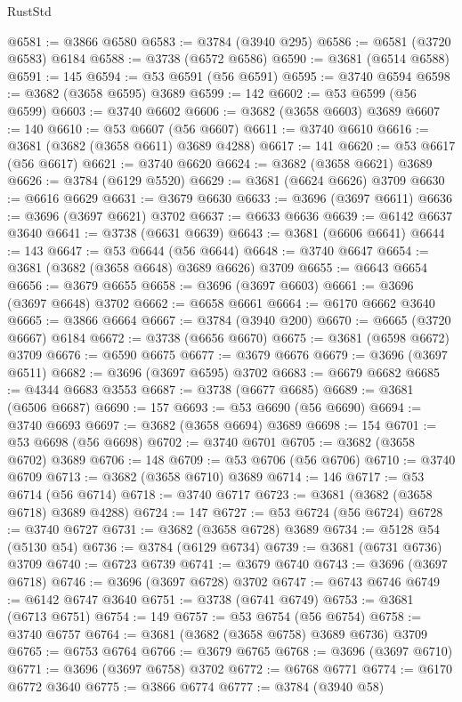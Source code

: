 \begin{lexlean}{RustStd}
\begin{coremodule}
@6581 := @3866 @6580
@6583 := @3784 (@3940 @295)
@6586 := @6581 (@3720 @6583) @6184
@6588 := @3738 (@6572 @6586)
@6590 := @3681 (@6514 @6588)
@6591 := 145
@6594 := @53 @6591 (@56 @6591)
@6595 := @3740 @6594
@6598 := @3682 (@3658 @6595) @3689
@6599 := 142
@6602 := @53 @6599 (@56 @6599)
@6603 := @3740 @6602
@6606 := @3682 (@3658 @6603) @3689
@6607 := 140
@6610 := @53 @6607 (@56 @6607)
@6611 := @3740 @6610
@6616 := @3681 (@3682 (@3658 @6611) @3689 @4288)
@6617 := 141
@6620 := @53 @6617 (@56 @6617)
@6621 := @3740 @6620
@6624 := @3682 (@3658 @6621) @3689
@6626 := @3784 (@6129 @5520)
@6629 := @3681 (@6624 @6626) @3709
@6630 := @6616 @6629
@6631 := @3679 @6630
@6633 := @3696 (@3697 @6611)
@6636 := @3696 (@3697 @6621) @3702
@6637 := @6633 @6636
@6639 := @6142 @6637 @3640
@6641 := @3738 (@6631 @6639)
@6643 := @3681 (@6606 @6641)
@6644 := 143
@6647 := @53 @6644 (@56 @6644)
@6648 := @3740 @6647
@6654 := @3681 (@3682 (@3658 @6648) @3689 @6626) @3709
@6655 := @6643 @6654
@6656 := @3679 @6655
@6658 := @3696 (@3697 @6603)
@6661 := @3696 (@3697 @6648) @3702
@6662 := @6658 @6661
@6664 := @6170 @6662 @3640
@6665 := @3866 @6664
@6667 := @3784 (@3940 @200)
@6670 := @6665 (@3720 @6667) @6184
@6672 := @3738 (@6656 @6670)
@6675 := @3681 (@6598 @6672) @3709
@6676 := @6590 @6675
@6677 := @3679 @6676
@6679 := @3696 (@3697 @6511)
@6682 := @3696 (@3697 @6595) @3702
@6683 := @6679 @6682
@6685 := @4344 @6683 @3553
@6687 := @3738 (@6677 @6685)
@6689 := @3681 (@6506 @6687)
@6690 := 157
@6693 := @53 @6690 (@56 @6690)
@6694 := @3740 @6693
@6697 := @3682 (@3658 @6694) @3689
@6698 := 154
@6701 := @53 @6698 (@56 @6698)
@6702 := @3740 @6701
@6705 := @3682 (@3658 @6702) @3689
@6706 := 148
@6709 := @53 @6706 (@56 @6706)
@6710 := @3740 @6709
@6713 := @3682 (@3658 @6710) @3689
@6714 := 146
@6717 := @53 @6714 (@56 @6714)
@6718 := @3740 @6717
@6723 := @3681 (@3682 (@3658 @6718) @3689 @4288)
@6724 := 147
@6727 := @53 @6724 (@56 @6724)
@6728 := @3740 @6727
@6731 := @3682 (@3658 @6728) @3689
@6734 := @5128 @54 (@5130 @54)
@6736 := @3784 (@6129 @6734)
@6739 := @3681 (@6731 @6736) @3709
@6740 := @6723 @6739
@6741 := @3679 @6740
@6743 := @3696 (@3697 @6718)
@6746 := @3696 (@3697 @6728) @3702
@6747 := @6743 @6746
@6749 := @6142 @6747 @3640
@6751 := @3738 (@6741 @6749)
@6753 := @3681 (@6713 @6751)
@6754 := 149
@6757 := @53 @6754 (@56 @6754)
@6758 := @3740 @6757
@6764 := @3681 (@3682 (@3658 @6758) @3689 @6736) @3709
@6765 := @6753 @6764
@6766 := @3679 @6765
@6768 := @3696 (@3697 @6710)
@6771 := @3696 (@3697 @6758) @3702
@6772 := @6768 @6771
@6774 := @6170 @6772 @3640
@6775 := @3866 @6774
@6777 := @3784 (@3940 @58)

\end{coremodule}
\end{lexlean}
